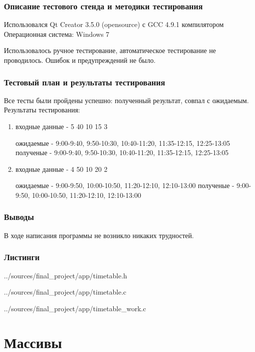 \documentclass[12pt,a4paper]{report}
\begin{document}
\subsection{Описание тестового стенда и методики тестирования}

Использовался Qt Creator 3.5.0 (opensource) с GCC 4.9.1 компилятором
Операционная система: Windows 7


Использовалось ручное тестирование, автоматическое тестирование не проводилось.
Ошибок и предупреждений не было.

\subsection{Тестовый план и результаты тестирования}
Все тесты были пройдены успешно: полученный результат, совпал с ожидаемым. Результаты тестирования:

\begin{enumerate}
\item входные данные - 5 40 10 15 3

ожидаемые - 9:00-9:40, 9:50-10:30, 10:40-11:20, 11:35-12:15, 12:25-13:05
полученые - 9:00-9:40, 9:50-10:30, 10:40-11:20, 11:35-12:15, 12:25-13:05

\item входные данные - 4 50 10 20 2

ожидаемые - 9:00-9:50, 10:00-10:50, 11:20-12:10, 12:10-13:00
полученые - 9:00-9:50, 10:00-10:50, 11:20-12:10, 12:10-13:00
\end{enumerate}


\subsection{Выводы}

В ходе написания программы не возникло никаких трудностей.

\subsection*{Листинги}

{../sources/final_project/app/timetable.h}

{../sources/final_project/app/timetable.c}

{../sources/final_project/app/timetable_work.c}

\chapter{Массивы}
\end{document}
